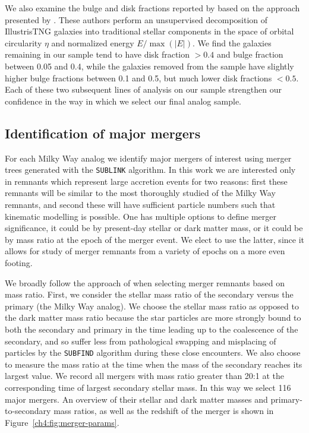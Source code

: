 We also examine the bulge and disk fractions reported by \textcite{du20} based on the approach presented by \textcite{du19}. These authors perform an unsupervised decomposition of IllustrisTNG galaxies into traditional stellar components in the space of orbital circularity $\eta$ and normalized energy $E/\max(\vert E \vert)$. We find the galaxies remaining in our sample tend to have disk fraction $>0.4$ and bulge fraction between 0.05 and 0.4, while the galaxies removed from the sample have slightly higher bulge fractions between 0.1 and 0.5, but much lower disk fractions $<0.5$. Each of these two subsequent lines of analysis on our sample strengthen our confidence in the way in which we select our final analog sample. 

\subsection{Identification of major mergers}

For each Milky Way analog we identify major mergers of interest using merger trees generated with the \texttt{SUBLINK} \parencite{rodriguez-gomez15} algorithm. In this work we are interested only in remnants which represent large accretion events for two reasons: first these remnants will be similar to the most thoroughly studied of the Milky Way remnants, and second these will have sufficient particle numbers such that kinematic modelling is possible. One has multiple options to define merger significance, it could be by present-day stellar or dark matter mass, or it could be by mass ratio at the epoch of the merger event. We elect to use the latter, since it allows for study of merger remnants from a variety of epochs on a more even footing.

We broadly follow the approach of \textcite{rodriguez-gomez16} when selecting merger remnants based on mass ratio. First, we consider the stellar mass ratio of the secondary versus the primary (the Milky Way analog). We choose the stellar mass ratio as opposed to the dark matter mass ratio because the star particles are more strongly bound to both the secondary and primary in the time leading up to the coalescence of the secondary, and so suffer less from pathological swapping and misplacing of particles by the \texttt{SUBFIND} algorithm during these close encounters. We also choose to measure the mass ratio at the time when the mass of the secondary reaches its largest value. We record all mergers with mass ratio greater than 20:1 at the corresponding time of largest secondary stellar mass. In this way we select 116 major mergers. An overview of their stellar and dark matter masses and primary-to-secondary mass ratios, as well as the redshift of the merger is shown in Figure~\ref{ch4:fig:merger-params}.

